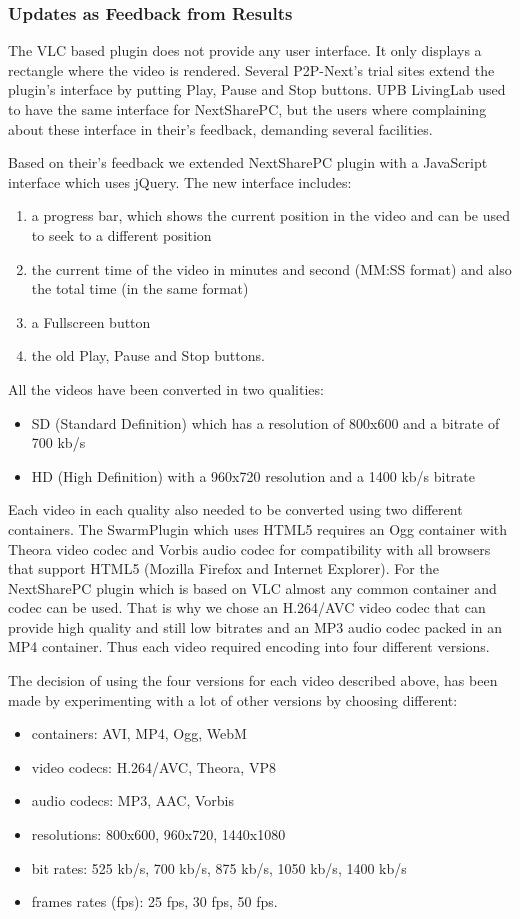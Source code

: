 \subsubsection{Updates as Feedback from Results}

The VLC based plugin does not provide any user interface. It only displays a
rectangle where the video is rendered. Several P2P-Next's trial sites extend
the plugin's interface by putting Play, Pause and Stop buttons. UPB LivingLab
used to have the same interface for NextSharePC, but the users where
complaining about these interface in their's feedback, demanding several
facilities.

Based on their's feedback we extended NextSharePC plugin with a JavaScript
interface which uses jQuery. The new interface includes:
\begin{enumerate}
  \item a progress bar, which shows the current position in the video and can
  be used to seek to a different position
  \item the current time of the video in minutes and second (MM:SS format) and
  also the total time (in the same format)
  \item a Fullscreen button
  \item the old Play, Pause and Stop buttons.
\end{enumerate}

All the videos have been converted in two qualities: 
\begin{itemize}
  \item SD (Standard Definition) which has a resolution of 800x600 and a
  bitrate of 700 kb/s
  \item HD (High Definition) with a 960x720 resolution and a 1400 kb/s bitrate
\end{itemize}

Each video in each quality also needed to be converted using two different
containers. The SwarmPlugin which uses HTML5 requires an Ogg container with
Theora video codec and Vorbis audio codec for compatibility with all browsers
that support HTML5 (Mozilla Firefox and Internet Explorer). For the
NextSharePC plugin which is based on VLC almost any common container and codec
can be used. That is why we chose an H.264/AVC video codec that can provide
high quality and still low bitrates and an MP3 audio codec packed in an MP4
container. Thus each video required encoding into four different versions.

The decision of using the four versions for each video described above, has
been made by experimenting with a lot of other versions by choosing different:
\begin{itemize}
  \item containers: AVI, MP4, Ogg, WebM
  \item video codecs: H.264/AVC, Theora, VP8
  \item audio codecs: MP3, AAC, Vorbis
  \item resolutions: 800x600, 960x720, 1440x1080
  \item bit rates: 525 kb/s, 700 kb/s, 875 kb/s, 1050 kb/s, 1400 kb/s
  \item frames rates (fps): 25 fps, 30 fps, 50 fps.
\end{itemize}

